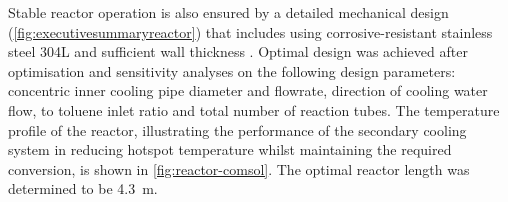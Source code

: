 

Stable reactor operation is also ensured by a detailed mechanical design (\cref{fig:executivesummaryreactor}) that includes using corrosive-resistant stainless steel 304L and sufficient wall thickness \cite{cm_selection_nodate}. Optimal design was achieved after optimisation and sensitivity analyses on the following design parameters: concentric inner cooling pipe diameter and flowrate, direction of cooling water flow,  to toluene inlet ratio and total number of reaction tubes. The temperature profile of the reactor, illustrating the performance of the secondary cooling system in reducing hotspot temperature whilst maintaining the required conversion, is shown in \cref{fig:reactor-comsol}. The optimal reactor length was determined to be \SI{4.3}{\m}.  %


